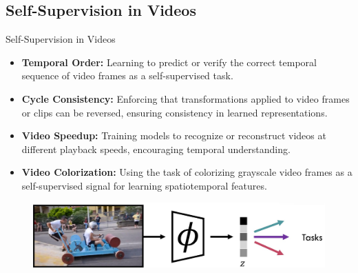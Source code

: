 \subsection{Self-Supervision in Videos}
\begin{frame}[allowframebreaks]{Self-Supervision in Videos}
    \begin{itemize}
        \item \textbf{Temporal Order:} Learning to predict or verify the correct temporal sequence of video frames as a self-supervised task.
        \item \textbf{Cycle Consistency:} Enforcing that transformations applied to video frames or clips can be reversed, ensuring consistency in learned representations.
        \item \textbf{Video Speedup:} Training models to recognize or reconstruct videos at different playback speeds, encouraging temporal understanding.
        \item \textbf{Video Colorization:} Using the task of colorizing grayscale video frames as a self-supervised signal for learning spatiotemporal features.
    \end{itemize}
    \begin{figure}
        \centering
        \includegraphics[width=1\textwidth,height=0.25\textheight,keepaspectratio]{images/video/slide_43_1_img.jpg}
    \end{figure}
\end{frame}